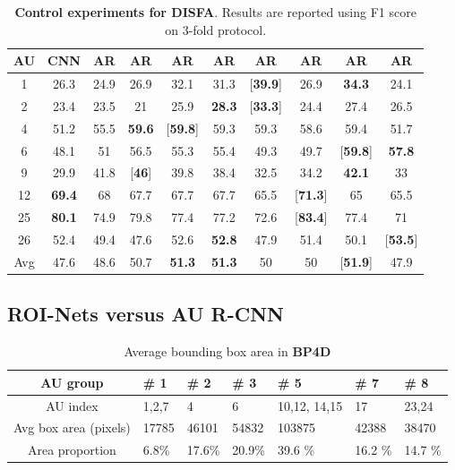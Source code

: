 \documentclass[5p,twocolumn]{elsarticle}
\begin{document}
\begin{table*}
	\scriptsize
	\centering
	
	\setlength{\abovecaptionskip}{0pt} 
	
	\caption{\textbf{Control experiments for DISFA}. Results are reported using F1 score on 3-fold protocol.}
	\label{tab:DISFA_control_expr}

	
	\centering
	\tabcolsep=0.05cm
	\begin{tabular}{c*{9}{c}}
		
		\toprule
		AU & CNN & AR & AR & AR & AR & AR & AR & AR & AR \\
		\midrule
		1 & 26.3 & 24.9 & 26.9 & 32.1 & 31.3 & [\textbf{39.9}] & 26.9 & \textbf{34.3} & 24.1  \\
		2 & 23.4 & 23.5 & 21 & 25.9 & \textbf{28.3} & [\textbf{33.3}] & 24.4 & 27.4 & 26.5  \\
		4 & 51.2 & 55.5 & \textbf{59.6} & [\textbf{59.8}] & 59.3 & 59.3 & 58.6 & 59.4 & 51.7 \\
		6 & 48.1 & 51 & 56.5 & 55.3 & 55.4 & 49.3 & 49.7 & [\textbf{59.8}] & \textbf{57.8} \\
		9 & 29.9 & 41.8 & [\textbf{46}] & 39.8 & 38.4 & 32.5 & 34.2 & \textbf{42.1} & 33 \\
		12 & \textbf{69.4} & 68 & 67.7 & 67.7 & 67.7 & 65.5 & [\textbf{71.3}] & 65 & 65.5\\
		25 & \textbf{80.1} & 74.9 & 79.8 & 77.4 & 77.2 & 72.6 & [\textbf{83.4}] & 77.4 & 71 \\
		26 & 52.4 & 49.4 & 47.6 & 52.6 & \textbf{52.8} & 47.9 & 51.4 & 50.1 & [\textbf{53.5}] \\
		\midrule
		Avg & 47.6 & 48.6 & 50.7 & \textbf{51.3} & \textbf{51.3} & 50 & 50 & [\textbf{51.9}] & 47.9 \\
		\bottomrule
	\end{tabular}
	\vspace{0.0cm}
\end{table*}


\subsection{ROI-Nets versus AU R-CNN}


\begin{table}[htp]
	\scriptsize	
	\setlength{\abovecaptionskip}{0pt}
	\setlength{\abovecaptionskip}{0pt}
	\caption{Average bounding box area in \textbf{BP4D}}
	\label{tab:BP4D_AREA}
	\centering
	\tabcolsep=0.15cm
	\begin{tabular}{c*{6}{p{6.7ex}}}
		\toprule
		AU group & \# 1 & \# 2 & \# 3 & \# 5 & \# 7 & \# 8\\
		\midrule
		AU index & 1,2,7 & 4 & 6 & 10,12, 14,15 & 17 & 23,24 \\
		\midrule
		Avg box area (pixels) & 17785 & 46101 & 54832 & 103875 & 42388 & 38470 \\
		Area proportion & 6.8\% & 17.6\% & 20.9\% & 39.6 \% & 16.2 \% & 14.7 \% \\
		\bottomrule
	\end{tabular}
	\vspace{1cm}
\end{table}
\end{document}
